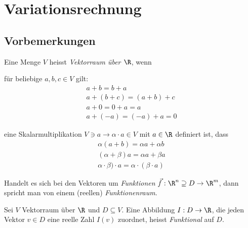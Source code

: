 
\section{Variationsrechnung} %
	
	\subsection{Vorbemerkungen} %
		
		\begin{definition}
			Eine Menge $V$ heisst \emph{Vektorraum über $\R$}, wenn 
			\begin{tightitemize}
				\item für beliebige $a, b, c \in V$ gilt:
					\begin{gather*}
						a + b = b + a \tag{kommutativ} \\
						a + (b + c) = (a + b) + c \tag{assoziativ} \\
						a + 0 = 0 + a = a \tag{neutrales Element} \\
						a + (-a) = (-a) + a = 0 \tag{inverses Element}
					\end{gather*}
				\item eine Skalarmultiplikation $V \ni a \to \alpha \cdot a \in V$ mit $a \in \R$ definiert ist, dass
					\begin{gather*}
						\alpha (a + b) = \alpha a + \alpha b \\
						(\alpha + \beta) a = \alpha a + \beta a \tag{distributiv} \\
						\alpha \cdot \beta) \cdot a = \alpha \cdot (\beta \cdot a) \tag{assoziativ}
					\end{gather*}
			\end{tightitemize}
			
			Handelt es sich bei den Vektoren um \emph{Funktionen} $\vec{f}: \R^{n} \supseteq D \to \R^{m}$, dann spricht man von einem (reellen) \emph{Funktionenraum}.
		\end{definition}
		
		\begin{definition}
			Sei $V$ Vektorraum über $\R$ und $D \subseteq V$. Eine Abbildung $I: D \to \R$, die jeden Vektor $v \in D$ eine reelle Zahl $I(v)$ zuordnet, heisst \emph{Funktional} auf $D$.
		\end{definition}
		
	
